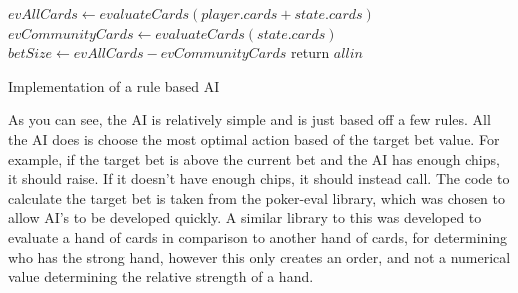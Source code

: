 \begin{algorithm}[H]
    \BlankLine{}
     $evAllCards \leftarrow evaluateCards(player.cards + state.cards)$\;
     $evCommunityCards \leftarrow evaluateCards(state.cards)$\;
     $betSize \leftarrow evAllCards - evCommunityCards$\;
     
                    {
                        return $allin$\;
                   }
\caption{Implementation of a rule based AI}%
\label{code:rule-based-ai}
\end{algorithm}

\vspace{0.3cm}

As you can see, the AI is relatively simple and is just based off a few rules.
All the AI does is choose the most optimal action based of the target bet
value. For example, if the target bet is above the current bet and the AI
has enough chips, it should raise. If it doesn't have enough chips, it should
instead call. The code to calculate the target bet is taken from the
poker-eval \parencite{code:dachary2004} library, which was chosen to allow
AI's to be developed quickly. A similar library to this was developed to
evaluate a hand of cards in comparison to another hand of cards, for determining
who has the strong hand, however this only creates an order, and not a
numerical value determining the relative strength of a hand.

